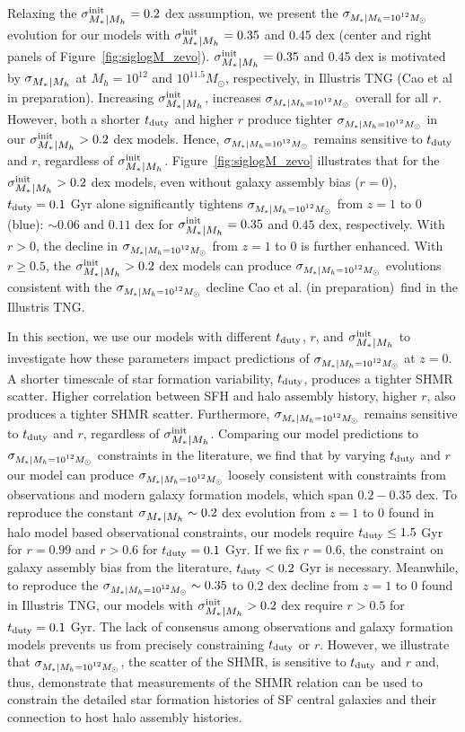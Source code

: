 \documentclass[12pt, letterpaper, preprint, tighten]{aastex62}
\newcommand{\cao}{Cao et al. (in preparation)}
\newcommand{\tduty}{t_{\rm duty}}
\newcommand{\siglogm}{\sigma_{\scaleto{M_*|M_h}{8pt}}}
\newcommand{\sigtwe}{\sigma_{\scaleto{M_*|M_h=10^{12}M_\odot}{8pt}}}
\begin{document}
Relaxing the $\siglogm^{\rm init} = 0.2$ dex assumption, we present the 
$\sigtwe$ evolution for our models with $\siglogm^{\rm init} = 0.35$
and 0.45 dex (center and right panels of Figure~\ref{fig:siglogM_zevo}).  
$\siglogm^{\rm init} = 0.35$ and 0.45 dex is motivated by $\siglogm$ at 
$M_h = 10^{12}$ and $10^{11.5}M_\odot$, respectively, in Illustris TNG (Cao et al in preparation). 
Increasing $\siglogm^{\rm init}$, increases $\sigtwe$ overall for all $r$. 
However, both a shorter $t_{\rm duty}$ and higher $r$ produce tighter 
$\sigtwe$ in our $\siglogm^{\rm init} > 0.2$ dex models. Hence, $\sigtwe$ 
remains sensitive to $t_{\rm duty}$ and $r$, regardless of $\siglogm^{\rm init}$. 
Figure~\ref{fig:siglogM_zevo} illustrates that for the $\siglogm^{\rm init}> 0.2$ dex 
models, even without galaxy assembly bias ($r=0$), $t_{\rm duty} = 0.1$ Gyr 
alone significantly tightens $\sigtwe$ from $z=1$ to 0 (blue): $\sim0.06$ and 
$0.11$ dex for $\siglogm^{\rm init} = 0.35$ and $0.45$ dex, respectively. With 
$r > 0$, the decline in $\sigtwe$ from $z=1$ to 0 is further enhanced. With 
$r \ge 0.5$, the $\siglogm^{\rm init}> 0.2$ dex models can produce $\sigtwe$ 
evolutions consistent with the $\sigtwe$ decline \cao~find in the Illustris 
TNG. 

In this section, we use our models with different $\tduty$, $r$, and 
$\siglogm^{\rm init}$ to investigate how these parameters impact predictions 
of $\sigtwe$ at $z{=}0$. A shorter timescale of star formation variability, 
$\tduty$, produces a tighter SHMR scatter. Higher correlation 
between SFH and halo assembly history, higher $r$, also produces a tighter 
SHMR scatter. Furthermore, $\sigtwe$ remains sensitive to $\tduty$ and $r$, 
regardless of $\siglogm^{\rm init}$. Comparing our model predictions to 
$\sigtwe$ constraints in the literature, we find that by varying $\tduty$ 
and $r$ our model can produce $\sigtwe$ loosely consistent with constraints 
from observations and modern galaxy formation models, which span $0.2 - 0.35$ dex. 
To reproduce the constant $\siglogm \sim 0.2$ dex evolution from $z=1$ to 0 
found in halo model based observational constraints, our models require 
$\tduty \leq 1.5$ Gyr for $r = 0.99$ and $r > 0.6$ for $\tduty = 0.1$ Gyr. 
If we fix $r = 0.6$, the constraint on galaxy assembly bias from the literature, 
$\tduty < 0.2$ Gyr is necessary. Meanwhile, to reproduce the 
$\sigtwe \sim 0.35$ to 0.2 dex decline from $z=1$ to 0 found in Illustris TNG, 
our models with $\siglogm^{\rm init} > 0.2$ dex require $r > 0.5$ for $\tduty = 0.1$ Gyr. 
The lack of consensus among observations and galaxy formation models prevents us 
from precisely constraining $\tduty$ or $r$. However, we illustrate that 
$\sigtwe$, the scatter of the SHMR, is sensitive to $\tduty$ and $r$ and, 
thus, demonstrate that measurements of the SHMR relation can be used to constrain 
the detailed star formation histories of SF central galaxies and their connection 
to host halo assembly histories.
\end{document}
